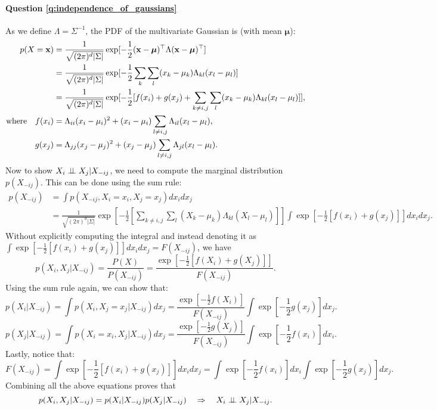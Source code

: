 \paragraph{Question \ref{q:independence_of_gaussians}}
As we define $\Lambda = \Sigma^{-1}$, the PDF of the multivariate Gaussian is (with mean $\bm{\mu}$):
\begin{equation*}
\begin{aligned}
p(X = \mathbf{x}) &= \frac{1}{\sqrt{ (2 \pi)^d | \Sigma |}} \exp [ -\frac{1}{2} (\mathbf{x} - \bm{\mu})^\top \Lambda (\mathbf{x} - \bm{\mu})^\top ] \\
&= \frac{1}{\sqrt{ (2 \pi)^d | \Sigma |}} \exp [ -\frac{1}{2} \sum_k \sum_l (x_k - \mu_k) \Lambda_{kl} (x_l - \mu_l) ] \\
&= \frac{1}{\sqrt{ (2 \pi)^d | \Sigma |}} \exp [ -\frac{1}{2} [ f(x_i) + g(x_j) + \sum_{k \neq i, j} \sum_l (x_k - \mu_k) \Lambda_{kl} (x_l - \mu_l) ] ], \\
\text{where} \quad f(x_i) &= \Lambda_{ii} (x_i - \mu_i)^2 + (x_i - \mu_i) \sum_{l \neq i, j} \Lambda_{il} (x_l - \mu_l), \\
g(x_j) &= \Lambda_{jj} (x_j - \mu_j)^2 + (x_j - \mu_j) \sum_{l \neq i, j} \Lambda_{jl} (x_l - \mu_l).
\end{aligned}
\end{equation*}
%
Now to show $X_i \perp\!\!\!\perp X_j | X_{-ij}$, we need to compute the marginal distribution $p(X_{-ij})$. This can be done using the sum rule:
\begin{equation}
\begin{aligned}
p(X_{-ij}) &= \int p(X_{-ij}, X_i = x_i, X_j = x_j) d x_i d x_j \\
&= \frac{1}{\sqrt{ (2 \pi)^d | \Sigma |}} \exp [ -\frac{1}{2} [ \sum_{k \neq i, j} \sum_l (X_k - \mu_k) \Lambda_{kl} (X_l - \mu_l) ] ] \int \exp [ -\frac{1}{2} [ f(x_i) + g(x_j) ] ] d x_i d x_j.
\end{aligned}
\end{equation}
Without explicitly computing the integral and instead denoting it as $\int \exp [ -\frac{1}{2} [ f(x_i) + g(x_j) ] ] d x_i d x_j = F(X_{-ij})$, we have
$$p(X_i, X_j | X_{-ij}) = \frac{P(X)}{P(X_{-ij})} = \frac{ \exp [ -\frac{1}{2} [ f(X_i) + g(X_j) ] ] }{F(X_{-ij})}.$$
Using the sum rule again, we can show that:
$$p(X_i | X_{-ij}) = \int p(X_i, X_j = x_j | X_{-ij}) d x_j = \frac{ \exp [ -\frac{1}{2} f(X_i) ] }{F(X_{-ij})} \int \exp[-\frac{1}{2} g(x_j)] d x_j.$$
$$p(X_j | X_{-ij}) = \int p(X_i = x_i, X_j | X_{-ij}) d x_j = \frac{ \exp [ -\frac{1}{2} g(X_j) ] }{F(X_{-ij})} \int \exp[-\frac{1}{2} f(x_i)] d x_i.$$
Lastly, notice that:
$$F(X_{-ij}) = \int \exp [ -\frac{1}{2} [ f(x_i) + g(x_j) ] ] d x_i d x_j = \int \exp[-\frac{1}{2} f(x_i)] d x_i \int \exp[-\frac{1}{2} g(x_j)] d x_j.$$
Combining all the above equations proves that
$$p(X_i, X_j | X_{-ij}) = p(X_i | X_{-ij}) p(X_j | X_{-ij}) \quad \Rightarrow \quad X_i \perp\!\!\!\perp X_j | X_{-ij}.$$

